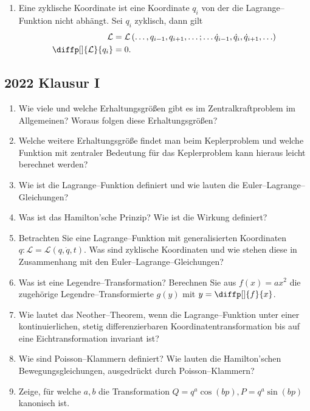 \documentclass[a4paper,12pt]{article}
\numberwithin{equation}{section}
\begin{document}
\begin{enumerate}[label=\arabic*.]
        \item Eine zyklische Koordinate ist eine Koordinate $q_i$ von der die Lagrange--Funktion nicht abhängt. Sei $q_i$ zyklisch, dann gilt
                \begin{align*} 
                        \mathcal{L}&=\mathcal{L}\left(\hdots ,q_{i-1},q_{i+1},\hdots ;\hdots \dot{q}_{i-1},\dot{q}_i,\dot{q}_{i+1},\hdots \right)\\
                        \diffp[]{\mathcal{L}}{q_i}&=0
                .\end{align*} 
\end{enumerate}
        
\newpage
\subsection{2022 Klausur I}
\begin{enumerate}[label=\arabic*.]
        \item Wie viele und welche Erhaltungsgrößen gibt es im Zentralkraftproblem im Allgemeinen? Woraus folgen diese Erhaltungsgrößen?
        \item Welche weitere Erhaltungsgröße findet man beim Keplerproblem und welche Funktion mit zentraler Bedeutung für das Keplerproblem kann hieraus leicht berechnet werden?
        \item Wie ist die Lagrange--Funktion definiert und wie lauten die Euler--Lagrange--Gleichungen?
        \item Was ist das Hamilton'sche Prinzip? Wie ist die Wirkung definiert?
        \item Betrachten Sie eine Lagrange--Funktion mit generalisierten Koordinaten $q:\mathcal{L}=\mathcal{L}\left(q,\dot{q},t\right)$. Was sind zyklische Koordinaten und wie stehen diese in Zusammenhang mit den Euler--Lagrange--Gleichungen?
        \item Was ist eine Legendre--Transformation? Berechnen Sie aus $f\left(x\right)=ax^2$ die zugehörige Legendre--Transformierte $g\left(y\right)$ mit $y=\diffp[]{f}{x}$.
        \item Wie lautet das Neother--Theorem, wenn die Lagrange--Funktion unter einer kontinuierlichen, stetig differenzierbaren Koordinatentransformation bis auf eine Eichtransformation invariant ist?
        \item Wie sind Poisson--Klammern definiert? Wie lauten die Hamilton'schen Bewegungsgleichungen, ausgedrückt durch Poisson--Klammern?
        \item Zeige, für welche $a,b$ die Transformation $Q=q^a\cos \left(bp\right),P=q^a\sin \left(bp\right)$ kanonisch ist.
\end{enumerate}
\end{document}

